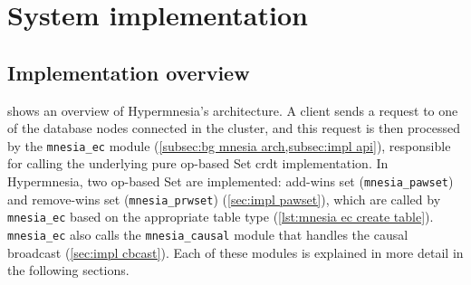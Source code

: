 
\section{System implementation} \label{sec:impl}


\subsection{Implementation overview} \label{sec:impl overview}

 shows an overview of Hypermnesia's architecture. 
A client sends a request to one of the database nodes connected in the cluster, 
and this request is then processed by the \verb|mnesia_ec| 
module (\cref{subsec:bg mnesia arch,subsec:impl api}), responsible
for calling the underlying pure op-based Set \acrshort{crdt} implementation.
In Hypermnesia, two op-based Set 
are implemented: add-wins set (\verb|mnesia_pawset|) and remove-wins set (\verb|mnesia_prwset|)
(\cref{sec:impl pawset}), which are called by \verb|mnesia_ec| based on the appropriate
table type (\cref{lst:mnesia ec create table}). 
\verb|mnesia_ec| also calls the \verb|mnesia_causal| module that handles the causal 
broadcast (\cref{sec:impl cbcast}). Each of these modules is explained in more
detail in the following sections.


